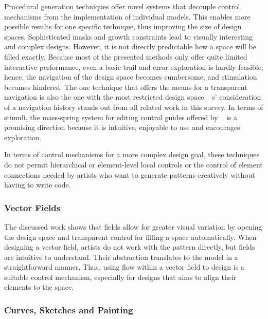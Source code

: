 Procedural generation techniques offer novel systems that decouple control mechanisms from the implementation of individual models. This enables more possible results for one specific technique, thus improving the size of design spaces. 
Sophisticated masks and growth constraints lead to visually interesting and complex designs. However, it is not directly predictable how a space will be filled exactly. Because most of the presented methods only offer quite limited interactive performance, even  a basic trail and error exploration is hardly feasible; hence, the navigation of the design space becomes cumbersome, and stimulation becomes hindered. The one technique \cite{santoni_2016_ggp} that offers the means for a transparent navigation is also the one with the most restricted design space. \citeauthor*{santoni_2016_ggp}~\cite{santoni_2016_ggp}s' consideration of a navigation history stands out from all related work in this survey. In terms of stimuli, the mass-spring system for editing control guides offered by \citeauthor*{benes_2011_gpm}~\cite{benes_2011_gpm} is a promising direction because it is intuitive, enjoyable to use and encourages exploration.

In terms of control mechanisms for a more complex design goal, these techniques do not permit hierarchical or element-level local controls or the control of element connections needed by artists who want to generate patterns creatively without having to write code.


\subsubsection{Vector Fields}
\label{subsubsec:analysis_creative_means_fields}

The discussed work 
shows that fields allow for greater visual variation by opening the design space and transparent control for filling a space automatically. When designing a vector field, artists do not work with the pattern directly, but fields are intuitive to understand. Their abstraction translates to the model in a straightforward manner. Thus, using flow within a vector field to design is a suitable control mechanism, especially for designs that aims to align their elements to the space.

\subsubsection{Curves, Sketches and Painting}
\label{subsubsec:analysis_creative_means_curves}

